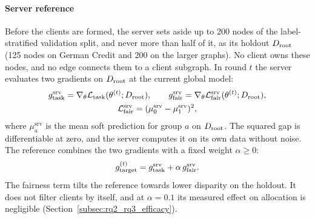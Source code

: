 \paragraph{Server reference}
Before the clients are formed, the server sets aside up to 200 nodes of the label-stratified validation split, and never more than half of it, as its holdout $D_{\mathrm{root}}$ (125 nodes on German Credit and 200 on the larger graphs). No client owns these nodes, and no edge connects them to a client subgraph. In round $t$ the server evaluates two gradients on $D_{\mathrm{root}}$ at the current global model:
\begin{equation}
\label{eq:srv_grads}
\begin{gathered}
g_{\mathrm{task}}^{\mathrm{srv}} = \nabla_\theta \mathcal{L}_{\mathrm{task}}(\theta^{(t)}; D_{\mathrm{root}}), \qquad g_{\mathrm{fair}}^{\mathrm{srv}} = \nabla_\theta \mathcal{L}^{\mathrm{srv}}_{\mathrm{fair}}(\theta^{(t)}; D_{\mathrm{root}}), \\
\mathcal{L}^{\mathrm{srv}}_{\mathrm{fair}} = (\mu_0^{\mathrm{srv}} - \mu_1^{\mathrm{srv}})^2,
\end{gathered}
\end{equation}
where $\mu_a^{\mathrm{srv}}$ is the mean soft prediction for group $a$ on $D_{\mathrm{root}}$. The squared gap is differentiable at zero, and the server computes it on its own data without noise. The reference combines the two gradients with a fixed weight $\alpha \ge 0$:
\begin{equation}
\label{eq:gtarg_def}
g_{\mathrm{target}}^{(t)} = g_{\mathrm{task}}^{\mathrm{srv}} + \alpha\, g_{\mathrm{fair}}^{\mathrm{srv}}.
\end{equation}
The fairness term tilts the reference towards lower disparity on the holdout. It does not filter clients by itself, and at $\alpha = 0.1$ its measured effect on allocation is negligible (Section~\ref{subsec:rq2_rq3_efficacy}).


